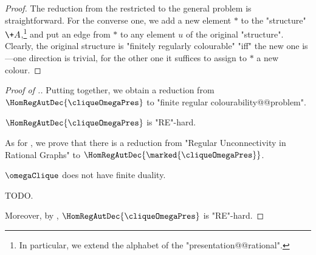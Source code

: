 \begin{proof}
	The reduction from the restricted to the general problem is straightforward.
	For the converse one, we add a new element $*$ to the "structure" $\+A$,\footnote{In particular, we extend the alphabet of the "presentation@@rational".} and put an edge
	from $*$ to any element $u$ of the original "structure". 
	Clearly, the original structure is "finitely regularly colourable" "iff" the new one is---one direction is trivial, for the other one it suffices to assign to $*$ a new colour.
\end{proof}

\begin{proof}[Proof of .]
	Putting  together, we obtain a reduction from
	$\HomRegAutDec{\cliqueOmegaPres}$ to "finite regular colourability@@problem".
	
	\begin{claim}
		$\HomRegAutDec{\cliqueOmegaPres}$ is "RE"-hard.
	\end{claim}
	As for , we prove that
	there is a reduction from "Regular Unconnectivity in Rational Graphs"
	to $\HomRegAutDec{\marked{\cliqueOmegaPres}}$.

	\begin{claim}
		$\omegaClique$ does not have finite duality.
	\end{claim}
	TODO.
	
	Moreover, by ,
	$\HomRegAutDec{\cliqueOmegaPres}$ is "RE"-hard.
\end{proof}
